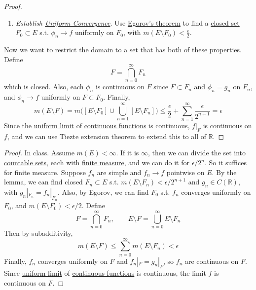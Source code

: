 \begin{proof}
\begin{enumerate}
      \item \textit{Establish \hyperref[real-def:uniform-convergence]{Uniform Convergence}}. Use \hyperref[thm:egorovs-theorem]{Egorov's theorem} to find a \hyperref[pst-def:closed]{closed set} $F_0 \subset E$  s.t. $\phi_n \to f$ uniformly on $F_0$, with $m(E \setminus F_0) < \frac{\epsilon}{2}$. 
    \end{enumerate}
    Now we want to restrict the domain to a set that has both of these properties. Define 
    \begin{equation}
      F = \bigcap_{n=0}^\infty F_n
    \end{equation}
    which is closed. Also, each $\phi_n$ is continuous on $F$ since $F \subset F_n$ and $\phi_n = g_n$ on $F_n$, and $\phi_n \to f$ uniformly on $F \subset F_0$. Finally, 
    \begin{equation}
      m(E \setminus F) = m \bigg( [E \setminus F_0] \cup \bigcup_{n=1}^\infty [E \setminus F_n] \bigg) \leq \frac{\epsilon}{2} + \sum_{n=1}^\infty \frac{\epsilon}{2^{n+1}} = \epsilon
    \end{equation}
    Since the \hyperref[pst-thm:uniform-limit-theorem]{uniform limit} of \hyperref[pst-def:continuous_func]{continuous functions} is continuous, $f |_F$ is continuous on $f$, and we can use Tiezte extension theorem to extend this to all of $\mathbb{R}$. 
  \end{proof}
  \begin{proof}
    In class. Assume $m(E) < \infty$. If it is $\infty$, then we can divide the set into \hyperref[st-def:countable]{countable sets}, each with \hyperref[def:finite-measure]{finite measure}, and we can do it for $\epsilon/2^{n}$. So it suffices for finite measure. Suppose $f_n$ are simple and $f_n \to f$ pointwise on $E$. By the lemma, we can find closed $F_n \subset E$ s.t. $m(E \setminus F_n) < \epsilon / 2^{n+1}$ and $g_n \in C(\mathbb{R})$, with $g_n |_{F_n} = f_n |_{F_n}$. Also, by Egorov, we can find $F_0$ s.t. $f_n$ converges uniformly on $F_0$, and $m(E \setminus F_0) < \epsilon / 2$. Define 
    \begin{equation}
      F = \bigcap_{n=0}^\infty F_n, \qquad E \setminus F = \bigcup_{n=0}^\infty E \setminus F_n
    \end{equation}
    Then by subadditivity,
    \begin{equation}
      m(E \setminus F) \leq \sum_{n=0}^\infty m(E \setminus F_n) < \epsilon
    \end{equation}
    Finally, $f_n$ converges uniformly on $F$ and $f_n |_F = g_n |_F$, so $f_n$ are continuous on $F$. Since \hyperref[pst-thm:uniform-limit-theorem]{uniform limit} of \hyperref[pst-def:continuous_func]{continuous functions} is continuous, the limit $f$ is continuous on $F$. 
  \end{proof}

